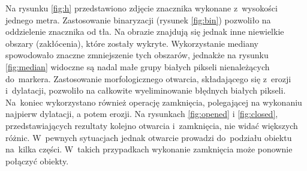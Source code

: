Na rysunku \ref{fig:h} przedstawiono zdjęcie znacznika wykonane z~wysokości jednego metra. 
Zastosowanie binaryzacji (rysunek \ref{fig:bin}) pozwoliło na oddzielenie znacznika od tła. %
Na obrazie znajdują się jednak inne niewielkie obszary (zakłócenia), które zostały wykryte. 
Wykorzystanie mediany spowodowało znaczne zmniejszenie tych obszarów, jednakże na rysunku \ref{fig:median} widoczne są nadal małe grupy białych pikseli nienależących do~markera. 
Zastosowanie morfologicznego otwarcia, składającego się z~erozji i~dylatacji,  pozwoliło na całkowite wyeliminowanie błędnych białych pikseli. 
Na~koniec wykorzystano również operację zamknięcia, polegającej na wykonaniu najpierw dylatacji, a potem erozji. 
Na rysunkach \ref{fig:opened} i \ref{fig:closed}, przedstawiających rezultaty kolejno otwarcia i~zamknięcia, nie widać większych różnic. 
W~pewnych sytuacjach jednak otwarcie prowadzi do~podziału obiektu na~kilka części. 
W~takich przypadkach wykonanie zamknięcia może ponownie połączyć obiekty. 



